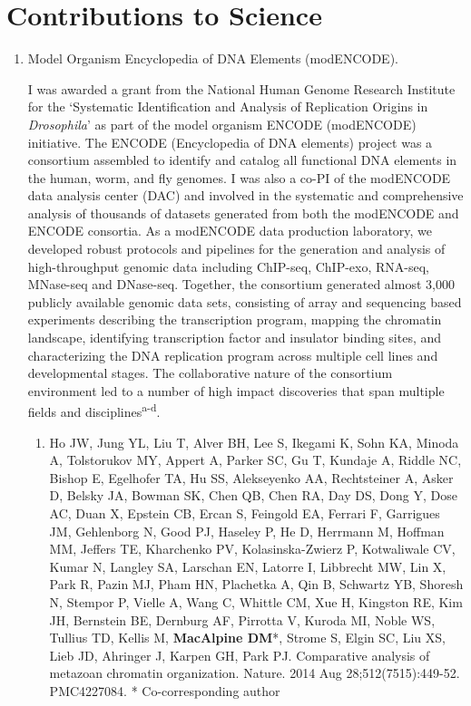 \documentclass{update_nihbiosketch}
\newcommand\dros{{\itshape Drosophila}\xspace}
\begin{document}

\section{Contributions to Science}

\begin{enumerate}


\item Model Organism Encyclopedia of DNA Elements (modENCODE).

\noindent I was awarded a grant from the National Human Genome Research Institute for the `Systematic Identification and Analysis of Replication Origins in \dros' as part of the model organism ENCODE (modENCODE) initiative. The ENCODE (Encyclopedia of DNA elements) project was a consortium assembled to identify and catalog all functional DNA elements in the human, worm, and fly genomes. I was also a co-PI of the modENCODE data analysis center (DAC) and involved in the systematic and comprehensive analysis of thousands of datasets generated from both the modENCODE and ENCODE consortia.  As a modENCODE data production laboratory, we developed robust protocols and pipelines for the generation and analysis of high-throughput genomic data including ChIP-seq, ChIP-exo, RNA-seq, MNase-seq and DNase-seq.  Together, the consortium generated almost 3,000 publicly available genomic data sets, consisting of array and sequencing based experiments describing the transcription program, mapping the chromatin landscape, identifying transcription factor and insulator binding sites, and characterizing the DNA replication program across multiple cell lines and developmental stages.  The collaborative nature of the consortium environment led to a number of high impact discoveries that span multiple fields and disciplines\textsuperscript{a-d}.

  
\begin{enumerate}
\setlength\itemsep{0.35em}

\item Ho JW, Jung YL, Liu T, Alver BH, Lee S, Ikegami K, Sohn KA, Minoda A, Tolstorukov MY, Appert A, Parker SC, Gu T, Kundaje A, Riddle NC, Bishop E, Egelhofer TA, Hu SS, Alekseyenko AA, Rechtsteiner A, Asker D, Belsky JA, Bowman SK, Chen QB, Chen RA, Day DS, Dong Y, Dose AC, Duan X, Epstein CB, Ercan S, Feingold EA, Ferrari F, Garrigues JM, Gehlenborg N, Good PJ, Haseley P, He D, Herrmann M, Hoffman MM, Jeffers TE, Kharchenko PV, Kolasinska-Zwierz P, Kotwaliwale CV, Kumar N, Langley SA, Larschan EN, Latorre I, Libbrecht MW, Lin X, Park R, Pazin MJ, Pham HN, Plachetka A, Qin B, Schwartz YB, Shoresh N, Stempor P, Vielle A, Wang C, Whittle CM, Xue H, Kingston RE, Kim JH, Bernstein BE, Dernburg AF, Pirrotta V, Kuroda MI, Noble WS, Tullius TD, Kellis M, \textbf{MacAlpine DM}*, Strome S, Elgin SC, Liu XS, Lieb JD, Ahringer J, Karpen GH, Park PJ. Comparative analysis of metazoan chromatin organization. Nature. 2014 Aug 28;512(7515):449-52. PMC4227084. * Co-corresponding author


\end{enumerate}
\end{enumerate}
\end{document}
